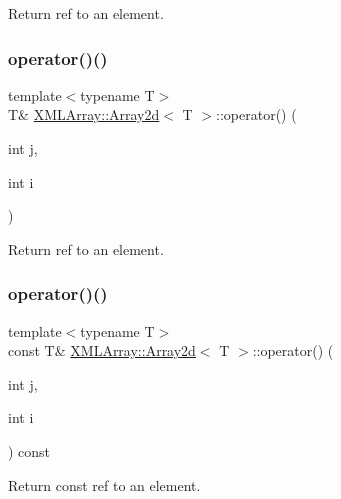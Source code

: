 Return ref to an element. 

\mbox{\label{classXMLArray_1_1Array2d_ab8618dbef1cc6b94b3345ce3da0ad996}} 
\subsubsection{\texorpdfstring{operator()()}{operator()()}\hspace{0.1cm}{\footnotesize\ttfamily [2/4]}}
{\footnotesize\ttfamily template$<$typename T$>$ \\
T\& \mbox{\hyperlink{classXMLArray_1_1Array2d}{X\+M\+L\+Array\+::\+Array2d}}$<$ T $>$\+::operator() (\begin{DoxyParamCaption}\item[{int}]{j,  }\item[{int}]{i }\end{DoxyParamCaption})\hspace{0.3cm}{\ttfamily [inline]}}



Return ref to an element. 

\mbox{\label{classXMLArray_1_1Array2d_aa02dc8ee58bd33aca0cfbbf58cbf1ba7}} 
\subsubsection{\texorpdfstring{operator()()}{operator()()}\hspace{0.1cm}{\footnotesize\ttfamily [3/4]}}
{\footnotesize\ttfamily template$<$typename T$>$ \\
const T\& \mbox{\hyperlink{classXMLArray_1_1Array2d}{X\+M\+L\+Array\+::\+Array2d}}$<$ T $>$\+::operator() (\begin{DoxyParamCaption}\item[{int}]{j,  }\item[{int}]{i }\end{DoxyParamCaption}) const\hspace{0.3cm}{\ttfamily [inline]}}



Return const ref to an element. 

